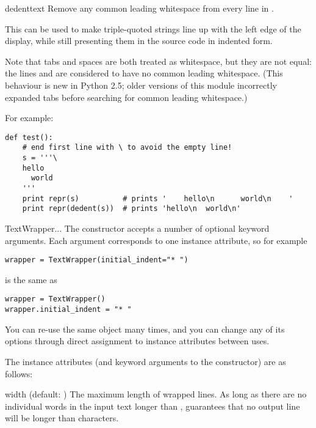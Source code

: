 \begin{funcdesc}{dedent}{text} 
Remove any common leading whitespace from every line in .

This can be used to make triple-quoted strings line up with the left
edge of the display, while still presenting them in the source code
in indented form.

Note that tabs and spaces are both treated as whitespace, but they are
not equal: the lines  and 
are considered to have no common leading whitespace.  (This behaviour is
new in Python 2.5; older versions of this module incorrectly expanded
tabs before searching for common leading whitespace.)

For example:
\begin{verbatim}
def test():
    # end first line with \ to avoid the empty line!
    s = '''\
    hello
      world
    '''
    print repr(s)          # prints '    hello\n      world\n    '
    print repr(dedent(s))  # prints 'hello\n  world\n'
\end{verbatim}
\end{funcdesc}

\begin{classdesc}{TextWrapper}{...}
The  constructor accepts a number of optional
keyword arguments.  Each argument corresponds to one instance attribute,
so for example
\begin{verbatim}
wrapper = TextWrapper(initial_indent="* ")
\end{verbatim}
is the same as
\begin{verbatim}
wrapper = TextWrapper()
wrapper.initial_indent = "* "
\end{verbatim}

You can re-use the same  object many times, and you
can change any of its options through direct assignment to instance
attributes between uses.
\end{classdesc}

The  instance attributes (and keyword arguments to
the constructor) are as follows:

\begin{memberdesc}{width}
(default: ) The maximum length of wrapped lines.  As long as
there are no individual words in the input text longer than
,  guarantees that no output line
will be longer than \member{width} characters.
\end{memberdesc}

